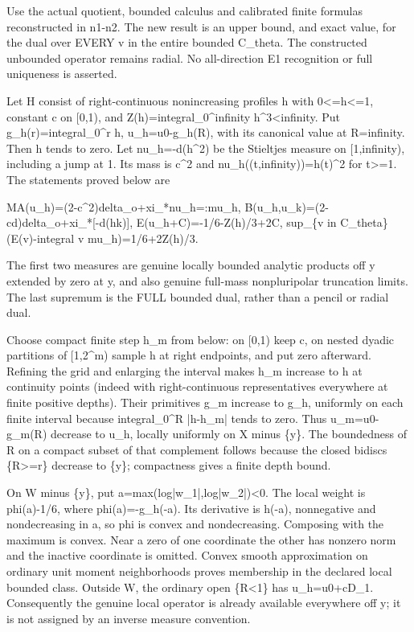 \documentclass[11pt]{article}
\begin{document}
Use the actual quotient, bounded calculus and calibrated finite formulas reconstructed in n1-n2. The new result is an upper bound, and exact value, for the dual over EVERY v in the entire bounded C\_theta. The constructed unbounded operator remains radial. No all-direction E1 recognition or full uniqueness is asserted.

Let H consist of right-continuous nonincreasing profiles h with 0<=h<=1, constant c on [0,1), and Z(h)=integral\_0\textasciicircum{}infinity h\textasciicircum{}3<infinity. Put g\_h(r)=integral\_0\textasciicircum{}r h, u\_h=u0-g\_h(R), with its canonical value at R=infinity. Then h tends to zero. Let nu\_h=-d(h\textasciicircum{}2) be the Stieltjes measure on [1,infinity), including a jump at 1. Its mass is c\textasciicircum{}2 and nu\_h((t,infinity))=h(t)\textasciicircum{}2 for t>=1. The statements proved below are

MA(u\_h)=(2-c\textasciicircum{}2)delta\_o+xi\_*nu\_h=:mu\_h,
B(u\_h,u\_k)=(2-cd)delta\_o+xi\_*[-d(hk)],
E(u\_h+C)=-1/6-Z(h)/3+2C,
sup\_\{v in C\_theta\}(E(v)-integral v mu\_h)=1/6+2Z(h)/3.

The first two measures are genuine locally bounded analytic products off y extended by zero at y, and also genuine full-mass nonpluripolar truncation limits. The last supremum is the FULL bounded dual, rather than a pencil or radial dual.

Choose compact finite step h\_m from below: on [0,1) keep c, on nested dyadic partitions of [1,2\textasciicircum{}m) sample h at right endpoints, and put zero afterward. Refining the grid and enlarging the interval makes h\_m increase to h at continuity points (indeed with right-continuous representatives everywhere at finite positive depths). Their primitives g\_m increase to g\_h, uniformly on each finite interval because integral\_0\textasciicircum{}R |h-h\_m| tends to zero. Thus u\_m=u0-g\_m(R) decrease to u\_h, locally uniformly on X minus \{y\}. The boundedness of R on a compact subset of that complement follows because the closed bidiscs \{R>=r\} decrease to \{y\}; compactness gives a finite depth bound.

On W minus \{y\}, put a=max(log|w\_1|,log|w\_2|)<0. The local weight is phi(a)-1/6, where phi(a)=-g\_h(-a). Its derivative is h(-a), nonnegative and nondecreasing in a, so phi is convex and nondecreasing. Composing with the maximum is convex. Near a zero of one coordinate the other has nonzero norm and the inactive coordinate is omitted. Convex smooth approximation on ordinary unit moment neighborhoods proves membership in the declared local bounded class. Outside W, the ordinary open \{R<1\} has u\_h=u0+cD\_1. Consequently the genuine local operator is already available everywhere off y; it is not assigned by an inverse measure convention.
\end{document}
